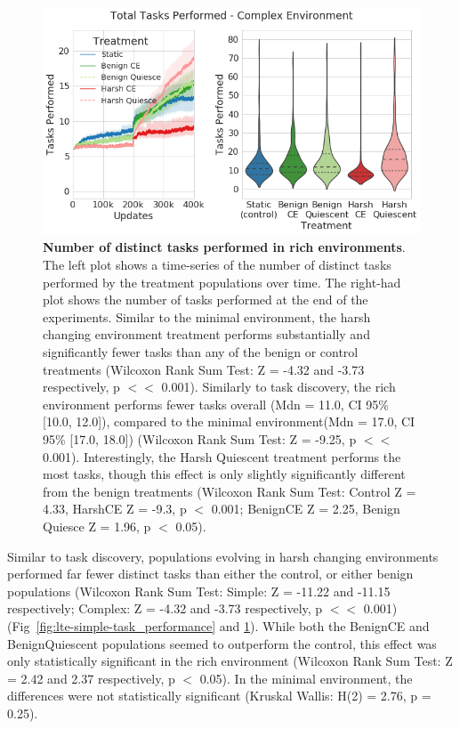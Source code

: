 \documentclass[PhD]{msu-thesis}
\begin{document}
	\begin{figure}[!h]
	\includegraphics[width=0.95\columnwidth]{figures/LTE/lte-complex-task_performance.png}
	\caption{\textbf{Number of distinct tasks performed in rich environments}. The left plot shows a time-series of the number of distinct tasks performed by the treatment populations over time. The right-had plot shows the number of tasks performed at the end of the experiments. Similar to the minimal environment, the harsh changing environment treatment performs substantially and significantly fewer tasks than any of the benign or control treatments (Wilcoxon Rank Sum Test: Z = -4.32 and -3.73 respectively, p $<<$ 0.001). Similarly to task discovery, the rich environment performs fewer tasks overall (Mdn = 11.0, CI 95\% [10.0, 12.0]), compared to the minimal environment(Mdn = 17.0, CI 95\% [17.0, 18.0]) (Wilcoxon Rank Sum Test: Z = -9.25, p $<<$ 0.001). Interestingly, the Harsh Quiescent treatment performs the most tasks, though this effect is only slightly significantly different from the benign treatments (Wilcoxon Rank Sum Test: Control Z = 4.33, HarshCE Z = -9.3, p $<$ 0.001; BenignCE Z = 2.25, Benign Quiesce Z = 1.96, p $<$ 0.05).  %
	}
	\label{fig:complex-task_performance}
	\end{figure}

Similar to task discovery, populations evolving in harsh changing environments performed far fewer distinct tasks than either the control, or either benign populations (Wilcoxon Rank Sum Test: Simple: Z = -11.22 and -11.15 respectively; Complex: Z = -4.32 and -3.73 respectively, p $<<$ 0.001) (Fig~\ref{fig:lte-simple-task_performance} and \ref{fig:complex-task_performance}). While both the BenignCE and BenignQuiescent
populations seemed to outperform the control, this effect was only statistically significant in the rich environment (Wilcoxon Rank Sum Test: Z = 2.42 and 2.37 respectively, p $<$ 0.05). In the minimal environment, the differences were not statistically significant (Kruskal Wallis: H(2) = 2.76, p = 0.25).
\end{document}
